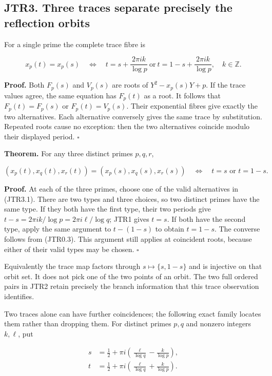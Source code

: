 \documentclass[
]{article}
\begin{document}
\subsection{JTR3. Three traces separate precisely the reflection
orbits}\label{jtr3.-three-traces-separate-precisely-the-reflection-orbits}

For a single prime the complete trace fibre is

\[
\boxed{
x_p(t)=x_p(s)
\quad\Longleftrightarrow\quad
t=s+\frac{2\pi i k}{\log p}
\ \text{or}\ 
t=1-s+\frac{2\pi i k}{\log p},
\quad k\in\mathbb Z.}
\tag{JTR3.1}
\]

\textbf{Proof.} Both \(F_p(s)\) and \(V_p(s)\) are roots of
\(Y^2-x_p(s)Y+p\). If the trace values agree, the same equation has
\(F_p(t)\) as a root. It follows that \(F_p(t)=F_p(s)\) or
\(F_p(t)=V_p(s)\). Their exponential fibres give exactly the two
alternatives. Each alternative conversely gives the same trace by
substitution. Repeated roots cause no exception: then the two
alternatives coincide modulo their displayed period. \(\square\)

\textbf{Theorem.} For any three distinct primes \(p,q,r\),

\[
\boxed{
(x_p(t),x_q(t),x_r(t))=(x_p(s),x_q(s),x_r(s))
\quad\Longleftrightarrow\quad t=s\text{ or }t=1-s.}
\tag{JTR3.2}
\]

\textbf{Proof.} At each of the three primes, choose one of the valid
alternatives in (JTR3.1). There are two types and three choices, so two
distinct primes have the same type. If they both have the first type,
their two periods give \(t-s=2\pi i k/\log p=2\pi i\ell/\log q\); JTR1
gives \(t=s\). If both have the second type, apply the same argument to
\(t-(1-s)\) to obtain \(t=1-s\). The converse follows from (JTR0.3).
This argument still applies at coincident roots, because either of their
valid types may be chosen. \(\square\)

Equivalently the trace map factors through \(s\mapsto\{s,1-s\}\) and is
injective on that orbit set. It does not pick one of the two points of
an orbit. The two full ordered pairs in JTR2 retain precisely the branch
information that this trace observation identifies.

Two traces alone can have further coincidences; the following exact
family locates them rather than dropping them. For distinct primes
\(p,q\) and nonzero integers \(k,\ell\), put

\[
\begin{aligned}
s&=\frac12+\pi i\left(\frac{\ell}{\log q}-\frac{k}{\log p}\right),\\
t&=\frac12+\pi i\left(\frac{\ell}{\log q}+\frac{k}{\log p}\right).
\end{aligned}
\tag{JTR3.3}
\]
\end{document}
